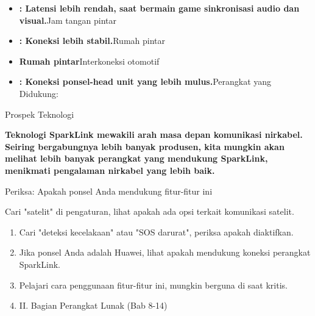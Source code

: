 
\begin{itemize}
  \item \textbf{: Latensi lebih rendah, saat bermain game sinkronisasi audio dan visual.}Jam tangan pintar
  \item \textbf{: Koneksi lebih stabil.}Rumah pintar
  \item \textbf{Rumah pintar}Interkoneksi otomotif
  \item \textbf{: Koneksi ponsel-head unit yang lebih mulus.}Perangkat yang Didukung:
\end{itemize}


Prospek Teknologi

\textbf{Teknologi SparkLink mewakili arah masa depan komunikasi nirkabel. Seiring bergabungnya lebih banyak produsen, kita mungkin akan melihat lebih banyak perangkat yang mendukung SparkLink, menikmati pengalaman nirkabel yang lebih baik.}\par

Periksa: Apakah ponsel Anda mendukung fitur-fitur ini

\begin{tcbpractice}{Cari "satelit" di pengaturan, lihat apakah ada opsi terkait komunikasi satelit.}
\begin{enumerate}
  \item Cari "deteksi kecelakaan" atau "SOS darurat", periksa apakah diaktifkan.
  \item Jika ponsel Anda adalah Huawei, lihat apakah mendukung koneksi perangkat SparkLink.
  \item Pelajari cara penggunaan fitur-fitur ini, mungkin berguna di saat kritis.
  \item II. Bagian Perangkat Lunak (Bab 8-14)
\end{enumerate}

\end{tcbpractice}
